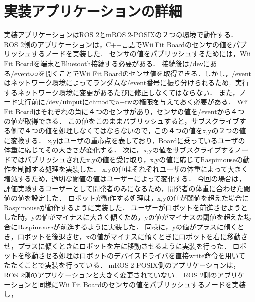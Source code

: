 \section{実装アプリケーションの詳細}
実装アプリケーションはROS 2とmROS 2-POSIXの２つの環境で動作する．
ROS 2側のアプリケーションは，C++言語でWii Fit Boardのセンサの値をパブリッシュするノードを実装した．
センサの値をパブリッシュするためには，Wii Fit Boardを端末とBluetooth接続する必要がある．
接続後は/devにある/event○○を開くことでWii Fit Boardのセンサ値を取得できる．しかし，/eventはネットワーク環境によってランダムな/event番号に振り分けられるため，実行するネットワーク環境に変更があるたびに修正しなくてはならない．
また，ノード実行前に/dev/uinputにchmodでa+rwの権限を与えておく必要がある．
Wii Fit Boardはそれぞれの角に４つのセンサがあり，センサの値を/eventから４つの値が取得できる．
この値をこのままパブリッシュすると，サブスクライブする側で４つの値を処理しなくてはならないので，この４つの値をx,yの２つの値に変換する．
x,yはユーザの重心点を表しており，Boardに乗っているユーザの体重に応じてその大きさが変化する．
次に，x,yの値をサブスクライブするノードではパブリッシュされたx,yの値を受け取り，x,yの値に応じてRaspimouseの動作を制御する処理を実装した．
x,yの値はそれぞれユーザの体重によって大きく増減するため，適切な閾値の値はユーザーによって変化する．
今回の場合は，評価実験するユーザーとして開発者のみになるため，開発者の体重に合わせた閾値の値を設定した．
ロボットが動作する処理は，x,yの値が閾値を超えた場合にRaspimouseが動作するように実装した．
ユーザーがロボットを前進させようとした時，yの値がマイナスに大きく傾くため，yの値がマイナスの閾値を超えた場合にRaspimouseが前進するように実装した．
同様に，yの値がプラスに傾くとき，ロボットを後退させ，xの値がマイナスに傾くときにロボットを右に移動させ，プラスに傾くときにロボットを左に移動させるように実装を行った．
ロボットを移動させる処理はロボットのデバイスドライバを直接write命令を用いてたたくことで実装を行っている．
mROS 2-POSIX側のアプリケーションは，ROS 2側のアプリケーションと大きく変更されていない．
ROS 2側のアプリケーションと同様にWii Fit Boardのセンサの値をパブリッシュするノードを実装し，




